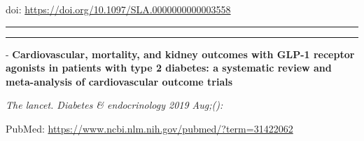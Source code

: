 \documentclass[]{article}
\begin{document}
doi: \url{https://doi.org/10.1097/SLA.0000000000003558}

{}

{}

\begin{center}\rule{0.5\linewidth}{\linethickness}\end{center}

\begin{center}\rule{0.5\linewidth}{\linethickness}\end{center}

 - \textbf{Cardiovascular, mortality, and kidney outcomes with GLP-1
receptor agonists in patients with type 2 diabetes: a systematic review
and meta-analysis of cardiovascular outcome trials}

\emph{The lancet. Diabetes \& endocrinology 2019 Aug;():}

PubMed: \url{https://www.ncbi.nlm.nih.gov/pubmed/?term=31422062}
\end{document}
